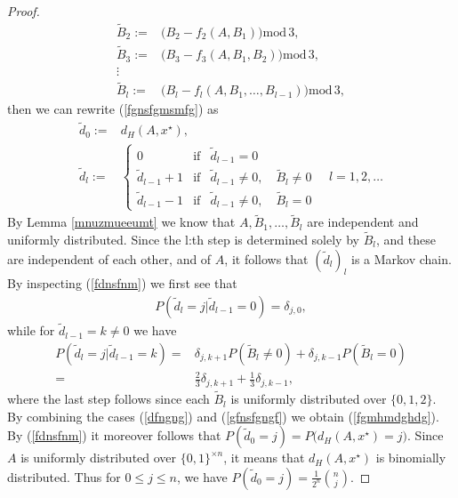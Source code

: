 \documentclass[a4paper,aps,floatfix]{revtex4}
\begin{document}
\begin{proof}
\begin{equation}
\begin{split}
\tilde{B}_2 := & \big(B_2 - f_2(A, B_1)\big)\mathrm{mod}\, 3,\\
\tilde{B}_3 := & \big(B_3  - f_3(A, B_1, B_2)\big)\mathrm{mod}\, 3,\\
\vdots & \\
\tilde{B}_l := & \big(B_l - f_l(A,B_1,\ldots, B_{l-1})\big)\mathrm{mod}\, 3,
\end{split}
\end{equation}
then we can rewrite (\ref{fgnsfgmsmfg}) as
\begin{equation}
\label{fdnsfnm}
\begin{split}
\tilde{d}_0 := &  d_H(A,x^{\star}),\\
\tilde{d}_{l} := & \left\{\begin{matrix}
0 & \mathrm{if} & \tilde{d}_{l-1} = 0\\
\tilde{d}_{l-1} + 1 & \mathrm{if} & \tilde{d}_{l-1} \neq 0,\quad  \tilde{B}_l  \neq 0\\
\tilde{d}_{l-1} - 1 & \mathrm{if} &  \tilde{d}_{l-1} \neq 0,\quad
\tilde{B}_l  = 0
\end{matrix}\right. \quad l = 1,2,\ldots
\end{split}
\end{equation}
By Lemma \ref{mnuzmueeumt} we know that $A,\tilde{B}_1,\ldots,\tilde{B}_l$ are independent and uniformly distributed.
Since the l:th step is determined solely by $\tilde{B}_l$, and these are independent of each other, and of $A$, it follows that $(\tilde{d}_l)_{l}$ is a Markov chain. 
By inspecting (\ref{fdnsfnm}) we first see that 
\begin{equation}
\label{dfngng}
\begin{split}
P(\tilde{d}_l = j|\tilde{d}_{l-1} = 0)  = \delta_{j,0},
\end{split}
\end{equation}
while for $\tilde{d}_{l-1} = k\neq 0$ we have
\begin{equation}
\label{gfnsfgngf}
\begin{split}
P(\tilde{d}_l = j|\tilde{d}_{l-1} = k)  = & \delta_{j,k+1} P(\tilde{B}_l  \neq 0) + \delta_{j,k-1}P(\tilde{B}_l  = 0)\\
= & \frac{2}{3}\delta_{j,k+1} + \frac{1}{3}\delta_{j,k-1},
\end{split}
\end{equation}
where the last step follows since each $\tilde{B}_l$ is uniformly distributed over $\{0,1,2\}$.
By combining the cases (\ref{dfngng}) and (\ref{gfnsfgngf}) we obtain (\ref{fgmhmdghdg}). By (\ref{fdnsfnm}) it moreover follows that $P(\tilde{d}_0 = j) = P\big(d_H(A,x^{\star})= j\big)$. Since $A$ is uniformly distributed over $\{0,1\}^{\times n}$, it means that $d_H(A,x^{\star})$ is binomially distributed. Thus for $0\leq j \leq n$, we have $P(\tilde{d}_0 = j) =\frac{1}{2^n}\binom{n}{j}$.


\end{proof}
\end{document}
